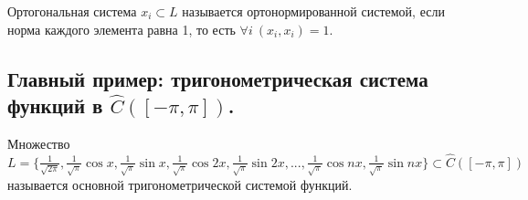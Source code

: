 \begin{definition}
    Ортогональная система ${x_i} \subset L$ называется ортонормированной системой, если норма каждого элемента равна 1, то есть $\forall i \> (x_i, x_i) = 1$.
\end{definition}


\subsection{Главный пример: тригонометрическая система функций в $\hat{C}([-\pi, \pi])$.}
\begin{definition}
    Множество $L = \{\frac{1}{\sqrt{2\pi}}, \frac{1}{\sqrt{\pi}} \cos x, \frac{1}{\sqrt{\pi}} \sin x, \frac{1}{\sqrt{\pi}} \cos 2x, \frac{1}{\sqrt{\pi}} \sin 2x, ..., \frac{1}{\sqrt{\pi}} \cos nx, \frac{1}{\sqrt{\pi}} \sin nx \} \subset \hat{C}([-\pi,\pi])$ называется основной тригонометрической системой функций.
\end{definition}

